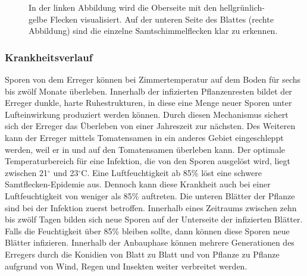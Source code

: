 \begin{figure}[h!]

	\hfill
	\hfill
	\hfill
	\caption{In der linken Abbildung wird die Oberseite mit den hellgrünlich-gelbe Flecken visualisiert. Auf der unteren Seite des Blattes (rechte Abbildung) sind die einzelne Samtschimmelflecken klar zu erkennen\cite{leaf_mold}.}
	\label{samtflecken_bilder}
\end{figure}



\subsubsection{Krankheitsverlauf}

Sporen von dem Erreger können bei Zimmertemperatur auf dem Boden für sechs bis zwölf Monate überleben. Innerhalb der infizierten Pflanzenresten bildet der Erreger dunkle, harte Ruhestrukturen, in diese eine Menge neuer Sporen unter Lufteinwirkung produziert werden können. Durch diesen Mechanismus sichert sich der Erreger das Überleben von einer Jahreszeit zur nächsten. Des Weiteren kann der Erreger mittels Tomatensamen in ein anderes Gebiet eingeschleppt werden, weil er in und auf den Tomatensamen überleben kann.
Der optimale Temperaturbereich für eine Infektion, die von den Sporen ausgelöst wird, liegt zwischen 21$^\circ$ und 23$^\circ\text{C}$. Eine Luftfeuchtigkeit ab 85\% löst eine schwere Samtflecken-Epidemie aus. Dennoch kann diese Krankheit auch bei einer Luftfeuchtigkeit von weniger als 85\% auftreten. Die unteren Blätter der Pflanze sind bei der Infektion zuerst betroffen. Innerhalb eines Zeitraums zwischen zehn bis zwölf Tagen bilden sich neue Sporen auf der Unterseite der infizierten Blätter. Falls die Feuchtigkeit über 85\% bleiben sollte, dann können diese Sporen neue Blätter infizieren. Innerhalb der Anbauphase können mehrere Generationen des Erregers durch die Konidien von Blatt zu Blatt und von Pflanze zu Pflanze aufgrund von Wind, Regen und Insekten weiter verbreitet werden\cite{leaf_mold, Passalora, Greenhouse}.







